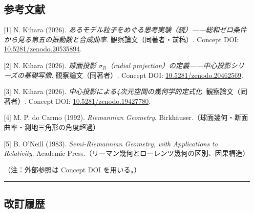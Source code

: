 \documentclass[
]{ltjsarticle}
\begin{document}
\subsection{参考文献}\label{ux53c2ux8003ux6587ux732e}

{[}1{]} N. Kihara (2026).
\emph{あるモデル粒子をめぐる思考実験（続）------総和ゼロ条件から見る第五の振動数と合成曲率}.
観察論文（同著者・前稿）. Concept DOI:
\href{https://doi.org/10.5281/zenodo.20535894}{10.5281/zenodo.20535894}.

{[}2{]} N. Kihara (2026). \emph{球面投影 \(\sigma_R\)（radial
projection）の定義------中心投影シリーズの基礎写像}. 観察論文（同著者）.
Concept DOI:
\href{https://doi.org/10.5281/zenodo.20462569}{10.5281/zenodo.20462569}.

{[}3{]} N. Kihara (2026).
\emph{中心投影による4次元空間の幾何学的定式化}. 観察論文（同著者）.
Concept DOI:
\href{https://doi.org/10.5281/zenodo.19427780}{10.5281/zenodo.19427780}.

{[}4{]} M. P. do Carmo (1992). \emph{Riemannian Geometry}.
Birkhäuser.（球面幾何・断面曲率・測地三角形の角度超過）

{[}5{]} B. O'Neill (1983). \emph{Semi-Riemannian Geometry, with
Applications to Relativity}. Academic
Press.（リーマン幾何とローレンツ幾何の区別、因果構造）

（注：外部参照は Concept DOI を用いる。）

\begin{center}\rule{0.5\linewidth}{0.5pt}\end{center}

\subsection{改訂履歴}\label{ux6539ux8a02ux5c65ux6b74}
\end{document}
